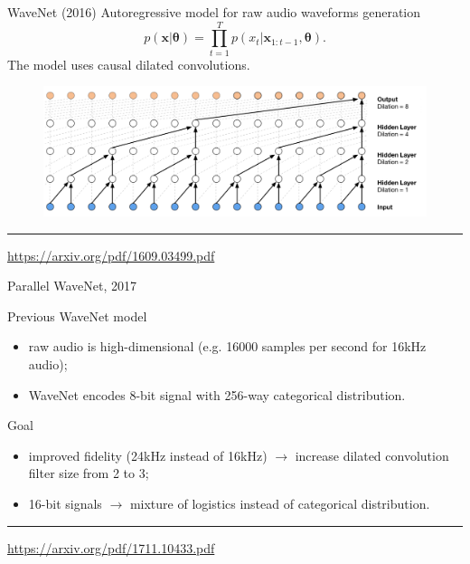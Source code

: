 \documentclass{beamer}
\newcommand{\bx}{\mathbf{x}}
\newcommand{\btheta}{\boldsymbol{\theta}}
\begin{document}
\begin{frame}{WaveNet (2016)}
	Autoregressive model for raw audio waveforms generation
	\vspace{-0.2cm}
	\[
	p(\bx| \btheta) = \prod_{t=1}^T p(x_t|\bx_{1:t-1}, \btheta).
	\]
	\vspace{-0.2cm}
	The model uses causal dilated convolutions.
	\begin{figure}
		\centering
		\includegraphics[width=0.9\linewidth]{figs/wavenet2.png}
	\end{figure}
	\vfill
	\hrule\medskip
	{\scriptsize \href{https://arxiv.org/pdf/1609.03499.pdf}{https://arxiv.org/pdf/1609.03499.pdf}}
\end{frame}
\begin{frame}{Parallel WaveNet, 2017}
	\begin{block}{Previous WaveNet model}
		\begin{itemize}
			\item raw audio is high-dimensional (e.g. 16000 samples per second for 16kHz audio);
			\item WaveNet encodes 8-bit signal with 256-way categorical distribution.
		\end{itemize}
	\end{block}
	\begin{block}{Goal}
		\begin{itemize}
			\item improved fidelity (24kHz instead of 16kHz) $\rightarrow$ increase dilated convolution filter size from 2 to 3;
			\item 16-bit signals $\rightarrow$ mixture of logistics instead of categorical distribution.
		\end{itemize}
	\end{block}
	\vfill
	\hrule\medskip
	{\scriptsize \href{https://arxiv.org/pdf/1711.10433.pdf}{https://arxiv.org/pdf/1711.10433.pdf}}
\end{frame}
\end{document}
